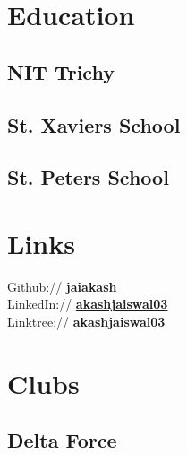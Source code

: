 \documentclass[]{deedy-resume-openfont}
\begin{document}

\begin{minipage}[t]{0.3\textwidth} 


\section{Education}

\subsection{NIT Trichy}
\sectionsep

\subsection{St. Xavier\textquotesingle{}s School}
\sectionsep

\subsection{St. Peter\textquotesingle{}s School}
\sectionsep


\section{Links} 
Github:// \href{https://github.com/jaiakash}{\bf jaiakash} \\
LinkedIn://  \href{https://www.linkedin.com/in/akashjaiswal03}{\bf akashjaiswal03} \\
Linktree://  \href{https://linktr.ee/akashjaiswal03}{\bf akashjaiswal03} \\

%
%
\section{Clubs}
\subsection{Delta Force}
\sectionsep


\end{minipage}
\end{document}
